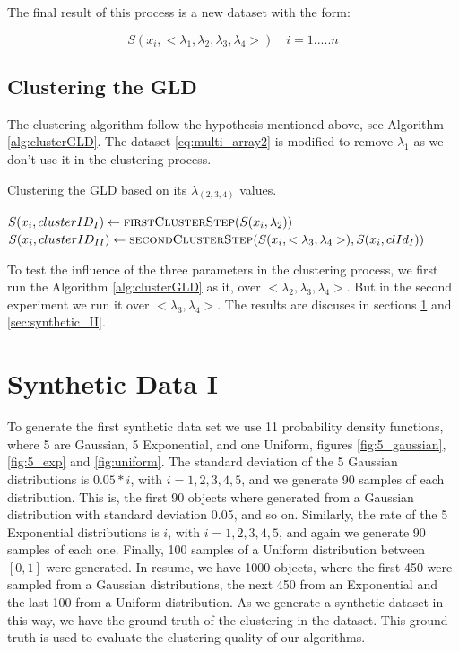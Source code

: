 The final result of this process is a new dataset with the form:

\begin{equation}\label{eq:multi_array2}
S(x_{i}, <\lambda_{1},\lambda_{2},\lambda_{3},\lambda_{4}>) \quad i=1.....n
\end{equation}

\subsection{Clustering the GLD}\label{sub:clustering_gld}

The clustering algorithm follow the hypothesis mentioned above, see Algorithm \ref{alg:clusterGLD}. The dataset \ref{eq:multi_array2} is modified to remove $\lambda_{1}$ as we don't use it in the clustering process. 

\begin{algorithm} 
\caption{Clustering the GLD based on its $\lambda_{(2,3,4)}$ values.}\label{alg:clusterGLD}
\begin{algorithmic}[1] 
\State $S(x_{i}, clusterID_{I}) \gets \Call {firstClusterStep}{S(x_{i},\lambda_{2})}$
\State $S(x_{i}, clusterID_{II}) \gets \Call {secondClusterStep}{S(x_{i},<\lambda_{3},\lambda_{4}>), S(x_{i}, clId_{I})}$
\EndFor
\EndFunction 
\end{algorithmic} 
\end{algorithm} 

To test the influence of the three parameters in the clustering process, we first run the Algorithm \ref{alg:clusterGLD} as it, over $<\lambda_{2},\lambda_{3},\lambda_{4}>$. But in the second experiment we run it over $<\lambda_{3},\lambda_{4}>$. The results are discuses in sections \ref{sec:synthetic_I} and \ref{sec:synthetic_II}.

\section{Synthetic Data I}\label{sec:synthetic_I}
To generate the first synthetic data set we use 11 probability density functions, where 5 are Gaussian, 5 Exponential, and one Uniform, figures \ref{fig:5_gaussian}, \ref{fig:5_exp} and \ref{fig:uniform}. The standard deviation of the 5 Gaussian distributions is $0.05*i$, with $i=1, 2, 3, 4, 5$, and we generate 90 samples of each distribution. This is, the first 90 objects where generated from a Gaussian distribution with standard deviation 0.05, and so on. Similarly, the rate of the 5 Exponential distributions is $i$, with $i=1, 2, 3, 4, 5$, and again we generate 90 samples of each one. Finally, 100 samples of a Uniform distribution between $[0, 1]$ were generated. In resume, we have 1000 objects, where the first 450 were sampled from a Gaussian distributions, the next 450 from an Exponential and the last 100 from a Uniform distribution. As we generate a synthetic dataset in this way, we have the ground truth of the clustering in the dataset. This ground truth is used to evaluate the clustering quality of our algorithms.

